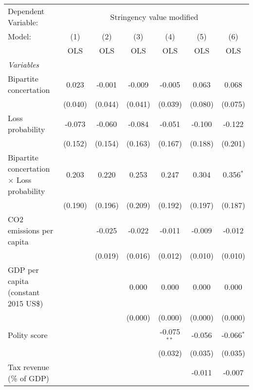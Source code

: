 
\begingroup
\centering
\begin{tabular}{lcccccc}
   \toprule
   Dependent Variable: & \multicolumn{6}{c}{Stringency value modified}\\
   Model:                                            & (1)     & (2)     & (3)     & (4)           & (5)     & (6)\\  
                                                     &  OLS    & OLS     & OLS     & OLS           & OLS     & OLS\\  
   \midrule
   \emph{Variables}\\
   Bipartite concertation                            & 0.023   & -0.001  & -0.009  & -0.005        & 0.063   & 0.068\\   
                                                     & (0.040) & (0.044) & (0.041) & (0.039)       & (0.080) & (0.075)\\   
   Loss probability                                  & -0.073  & -0.060  & -0.084  & -0.051        & -0.100  & -0.122\\   
                                                     & (0.152) & (0.154) & (0.163) & (0.167)       & (0.188) & (0.201)\\   
   Bipartite concertation $\times$ Loss probability  & 0.203   & 0.220   & 0.253   & 0.247         & 0.304   & 0.356$^{*}$\\   
                                                     & (0.190) & (0.196) & (0.209) & (0.192)       & (0.197) & (0.187)\\   
   CO2 emissions per capita                          &         & -0.025  & -0.022  & -0.011        & -0.009  & -0.012\\   
                                                     &         & (0.019) & (0.016) & (0.012)       & (0.010) & (0.010)\\   
   GDP per capita (constant 2015 US\$)               &         &         & 0.000   & 0.000         & 0.000   & 0.000\\   
                                                     &         &         & (0.000) & (0.000)       & (0.000) & (0.000)\\   
   Polity score                                      &         &         &         & -0.075$^{**}$ & -0.056  & -0.066$^{*}$\\   
                                                     &         &         &         & (0.032)       & (0.035) & (0.035)\\   
   Tax revenue (\% of GDP)                           &         &         &         &               & -0.011  & -0.007\\   

\end{tabular}
